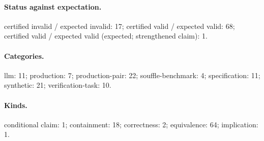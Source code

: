 \documentclass[10pt]{article}
\begin{document}
\paragraph{Status against expectation.} certified invalid / expected invalid: 17; certified valid / expected valid: 68; certified valid / expected valid (expected; strengthened claim): 1.

\paragraph{Categories.} llm: 11; production: 7; production-pair: 22; souffle-benchmark: 4; specification: 11; synthetic: 21; verification-task: 10.

\paragraph{Kinds.} conditional claim: 1; containment: 18; correctness: 2; equivalence: 64; implication: 1.
\end{document}
